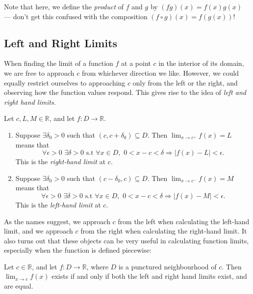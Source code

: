 \documentclass[
  17pt,
  a4paper]{extarticle}
\providecommand{\tightlist}{%
  \setlength{\itemsep}{0pt}\setlength{\parskip}{0pt}}
\theoremstyle{plain}
\theoremstyle{definition}
\theoremstyle{plain}
\theoremstyle{plain}
\theoremstyle{plain}
\theoremstyle{plain}
\theoremstyle{definition}
\theoremstyle{definition}
\theoremstyle{remark}
\theoremstyle{remark}
\let\BeginKnitrBlock\begin \let\EndKnitrBlock\end
\renewcommand{\;}{\,}
\begin{document}
Note that here, we define the \emph{product} of \(f\) and \(g\) by \((fg)(x) = f(x)g(x)\) --- don't get this confused with the composition \((f \circ g)(x) = f(g(x))\)!

\hypertarget{left-and-right-limits}{%
\subsection{Left and Right Limits}\label{left-and-right-limits}}

When finding the limit of a function \(f\) at a point \(c\) in the interior of its domain, we are free to approach \(c\) from whichever direction we like. However, we could equally restrict ourselves to approaching \(c\) only from the left or the right, and observing how the function values respond. This gives rise to the idea of \emph{left and right hand limits}.

\BeginKnitrBlock{definition}[Left and Right Hand Limits]
{\label{def:def1} }Let \(c, L, M \in \mathbb{R}\), and let \(f: D \to \mathbb{R}\).

\begin{enumerate}
\def\labelenumi{\arabic{enumi}.}
\tightlist
\item
  Suppose \(\exists \delta_0 > 0\) such that \((c, c + \delta_0) \subseteq D\). Then \(\lim_{x \to c^{+}}f(x) = L\) means that \[\forall \epsilon >0\;\;\exists \delta>0\;\;\text{s.t}\;\; \forall x \in D,\;\; 0 < x - c < \delta \Rightarrow \lvert f(x) - L \rvert < \epsilon.\] This is the \emph{right-hand limit} at \(c\).
\item
  Suppose \(\exists \delta_0 > 0\) such that \((c - \delta_0, c) \subseteq D\). Then \(\lim_{x \to c^{-}}f(x) = M\) means that \[\forall \epsilon >0\;\;\exists \delta>0\;\;\text{s.t}\;\; \forall x \in D,\;\; 0 < x - c < \delta \Rightarrow \lvert f(x) - M \rvert < \epsilon.\] This is the \emph{left-hand limit} at \(c\).
\end{enumerate}
\EndKnitrBlock{definition}

As the names suggest, we approach \(c\) from the left when calculating the left-hand limit, and we approach \(c\) from the right when calculating the right-hand limit. It also turns out that these objects can be very useful in calculating function limits, especially when the function is defined piecewise:

\BeginKnitrBlock{proposition}
{\label{prp:prop1} }Let \(c \in \mathbb{R}\), and let \(f: D \to \mathbb{R}\), where \(D\) is a punctured neighbourhood of \(c\). Then \(\lim_{x \to c}f(x)\) exists if and only if both the left and right hand limits exist, and are equal.
\EndKnitrBlock{proposition}
\end{document}
